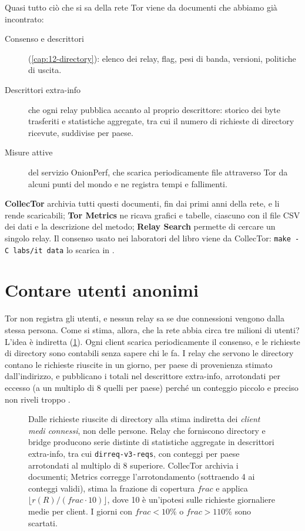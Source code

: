 Quasi tutto ciò che si sa della rete Tor viene da documenti che abbiamo già incontrato:
\begin{description}
  \item[Consenso e descrittori] (\cref{cap:12-directory}): elenco dei relay, flag, pesi di banda, versioni, politiche di uscita.
  \item[Descrittori extra-info] che ogni relay pubblica accanto al proprio descrittore: storico dei byte trasferiti e statistiche aggregate, tra cui il numero di richieste di directory ricevute, suddivise per paese.
  \item[Misure attive] del servizio OnionPerf, che scarica periodicamente file attraverso Tor da alcuni punti del mondo e ne registra tempi e fallimenti.
\end{description}
\textbf{CollecTor} archivia tutti questi documenti, fin dai primi anni della rete, e li rende scaricabili; \textbf{Tor Metrics} ne ricava grafici e tabelle, ciascuno con il file CSV dei dati e la descrizione del metodo; \textbf{Relay Search} permette di cercare un singolo relay. Il consenso usato nei laboratori del libro viene da CollecTor: \texttt{make -C labs/it data} lo scarica in .

\section{Contare utenti anonimi}\label{sec:metrics-utenti}

Tor non registra gli utenti, e nessun relay sa se due connessioni vengono dalla stessa persona. Come si stima, allora, che la rete abbia circa tre milioni di utenti? L'idea è indiretta (\cref{fig:stima}). Ogni client scarica periodicamente il consenso, e le richieste di directory sono contabili senza sapere chi le fa. I relay che servono le directory contano le richieste riuscite in un giorno, per paese di provenienza stimato dall'indirizzo, e pubblicano i totali nel descrittore extra-info, arrotondati per eccesso (a un multiplo di 8 quelli per paese) perché un conteggio piccolo e preciso non riveli troppo .

\begin{figure}[htbp]
\centering

\caption{Dalle richieste riuscite di directory alla stima indiretta dei \emph{client medi connessi}, non delle persone. Relay che forniscono directory e bridge producono serie distinte di statistiche aggregate in descrittori extra-info, tra cui \texttt{dirreq-v3-reqs}, con conteggi per paese arrotondati al multiplo di 8 superiore. CollecTor archivia i documenti; Metrics corregge l'arrotondamento (sottraendo 4 ai conteggi validi), stima la frazione di copertura $\mathit{frac}$ e applica $\lfloor r(R)/(\mathit{frac}\cdot10)\rfloor$, dove 10 è un'ipotesi sulle richieste giornaliere medie per client. I giorni con $\mathit{frac}<10\%$ o $\mathit{frac}>110\%$ sono scartati.}
\label{fig:stima}
\end{figure}

